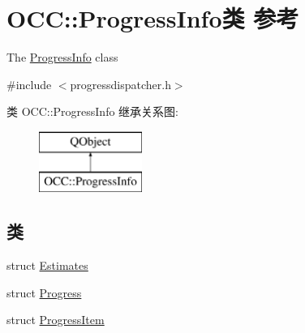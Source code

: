 \hypertarget{class_o_c_c_1_1_progress_info}{}\section{O\+CC\+:\+:Progress\+Info类 参考}
\label{class_o_c_c_1_1_progress_info}


The \hyperlink{class_o_c_c_1_1_progress_info}{Progress\+Info} class  




{\ttfamily \#include $<$progressdispatcher.\+h$>$}

类 O\+CC\+:\+:Progress\+Info 继承关系图\+:\begin{figure}[H]
\begin{center}
\leavevmode
\includegraphics[height=2.000000cm]{class_o_c_c_1_1_progress_info}
\end{center}
\end{figure}
\subsection*{类}
\begin{DoxyCompactItemize}
\item 
struct \hyperlink{struct_o_c_c_1_1_progress_info_1_1_estimates}{Estimates}
\item 
struct \hyperlink{struct_o_c_c_1_1_progress_info_1_1_progress}{Progress}
\item 
struct \hyperlink{struct_o_c_c_1_1_progress_info_1_1_progress_item}{Progress\+Item}
\end{DoxyCompactItemize}
